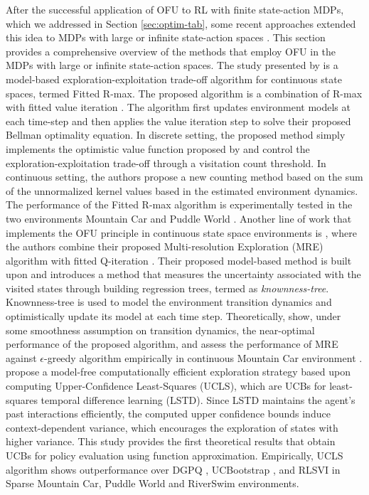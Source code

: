 After the successful application of OFU to RL with finite state-action MDPs, which we addressed in Section \ref{sec:optim-tab}, some recent approaches extended this idea to MDPs with large or infinite state-action spaces . This section provides a comprehensive overview of the methods that employ OFU in the  MDPs with large or infinite state-action spaces.
The study presented by  is a model-based exploration-exploitation trade-off algorithm for continuous state spaces, termed Fitted R-max. The proposed algorithm is a combination of R-max  with fitted value iteration . The algorithm first updates environment models at each time-step and then applies the value iteration step to solve their proposed Bellman optimality equation. In discrete setting, the proposed method simply implements the optimistic value function proposed by   and control the exploration-exploitation trade-off through a visitation count threshold. In continuous setting, the authors propose a new counting method based on the sum of the unnormalized kernel values based in the estimated environment dynamics. The performance of the Fitted R-max algorithm is experimentally tested in the two environments Mountain Car  and Puddle World . 
Another line of work that implements the OFU principle in continuous state space environments is , where the authors combine their proposed Multi-resolution Exploration (MRE) algorithm with fitted Q-iteration . Their proposed model-based method is built upon  and introduces a method that measures the uncertainty associated with the visited states through building regression trees, termed as \textit{knownness-tree}. Knownness-tree is used to model the environment transition dynamics and optimistically update its model at each time step. Theoretically,  show, under some smoothness assumption on transition dynamics, the near-optimal performance of the proposed algorithm, and assess the performance of MRE against $\epsilon$-greedy algorithm empirically in continuous Mountain Car environment . 
 propose a model-free computationally efficient exploration strategy based upon computing Upper-Confidence Least-Squares (UCLS), which are UCBs for least-squares temporal difference learning (LSTD). Since LSTD maintains the agent's past interactions efficiently, the computed upper confidence bounds induce context-dependent variance, which encourages the exploration of states with higher variance. This study provides the first theoretical results that obtain UCBs for policy evaluation using function approximation. Empirically, UCLS algorithm shows outperformance over DGPQ , UCBootstrap , and RLSVI  in Sparse Mountain Car, Puddle World and RiverSwim environments.
